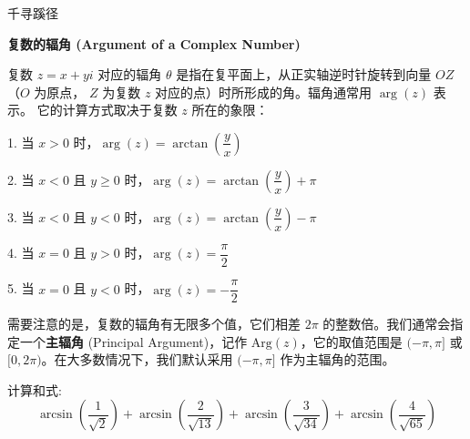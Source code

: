 \documentclass{ctexart}
\begin{document}
\thispagestyle{fancy}

\begin{center}
    \begin{chaptertitle}[复数专题]{\faBookOpen}{千寻蹊径}
    \end{chaptertitle}
\end{center}


\begin{theorembox}
\textbf{复数的辐角 (Argument of a Complex Number)}

复数 $z = x + yi$ 对应的辐角 $\theta$ 是指在复平面上，从正实轴逆时针旋转到向量 $OZ$（$O$ 为原点， $Z$ 为复数 $z$ 对应的点）时所形成的角。辐角通常用 $\arg(z)$ 表示。 它的计算方式取决于复数 $z$ 所在的象限：
\begin{spacing}{2.0}  %
1. 当 $x > 0$ 时，$\arg(z) = \arctan\left(\dfrac{y}{x}\right)$

2. 当 $x < 0$ 且 $y \ge 0$ 时，$\arg(z) = \arctan\left(\dfrac{y}{x}\right) + \pi$

3. 当 $x < 0$ 且 $y < 0$ 时，$\arg(z) = \arctan\left(\dfrac{y}{x}\right) - \pi$

4. 当 $x = 0$ 且 $y > 0$ 时，$\arg(z) = \dfrac{\pi}{2}$

5. 当 $x = 0$ 且 $y < 0$ 时，$\arg(z) = -\dfrac{\pi}{2}$
\end{spacing}
需要注意的是，复数的辐角有无限多个值，它们相差 $2\pi$ 的整数倍。我们通常会指定一个\textbf{主辐角} (Principal Argument)，记作 $\text{Arg}(z)$，它的取值范围是 $(-\pi, \pi]$ 或 $[0, 2\pi)$。在大多数情况下，我们默认采用 $(-\pi, \pi]$ 作为主辐角的范围。
\end{theorembox}

\begin{examplebox}
    计算和式:
$$
\arcsin \left( \dfrac{1}{\sqrt{2}} \right) + \arcsin \left( \dfrac{2}{\sqrt{13}} \right) + \arcsin \left( \dfrac{3}{\sqrt{34}} \right) + \arcsin \left( \dfrac{4}{\sqrt{65}} \right)
$$
\end{examplebox}
\end{document}
